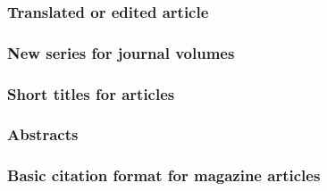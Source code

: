 \documentclass[11pt,letterpaper,oneside]{article}
\begin{document}
\begin{citebib}
\item \cite[65--70]{luu1999}
\item \cite{garrett1975}
\end{citebib}

\subsubsection{Translated or edited article}

\begin{citebib}
\item \cite{authorb}
\item \cite{authorc}
\end{citebib}

\subsubsection{New series for journal volumes}
\label{14.184}

\begin{citebib}
\item \cite[414]{sewall1896}
\item \cite{moraes1950}
\end{citebib}

\subsubsection{Short titles for articles}

\begin{citebib}
\item \cite[223]{rosenblum2015}
\item \cite[225]{rosenblum2015}
\end{citebib}

\subsubsection{Abstracts}

\begin{citebib}
\item \cite{matute2015}
\end{citebib}

\setcounter{subsubsection}{187}
\subsubsection{Basic citation format for magazine articles}
\end{document}
